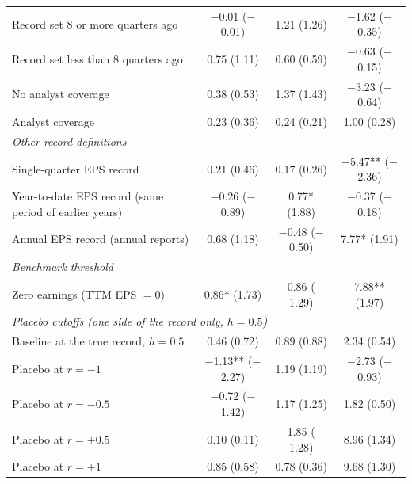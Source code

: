 \begin{tabular}{lccc}
\quad Record set 8 or more quarters ago & \ensuremath{-}0.01 (\ensuremath{-}0.01) & 1.21 (1.26) & \ensuremath{-}1.62 (\ensuremath{-}0.35)\\
\quad Record set less than 8 quarters ago & 0.75 (1.11) & 0.60 (0.59) & \ensuremath{-}0.63 (\ensuremath{-}0.15)\\
\quad No analyst coverage & 0.38 (0.53) & 1.37 (1.43) & \ensuremath{-}3.23 (\ensuremath{-}0.64)\\
\quad Analyst coverage & 0.23 (0.36) & 0.24 (0.21) & 1.00 (0.28)\\
\multicolumn{4}{l}{\textit{Other record definitions}}\\
\quad Single-quarter EPS record & 0.21 (0.46) & 0.17 (0.26) & \ensuremath{-}5.47** (\ensuremath{-}2.36)\\
\quad Year-to-date EPS record (same period of earlier years) & \ensuremath{-}0.26 (\ensuremath{-}0.89) & 0.77* (1.88) & \ensuremath{-}0.37 (\ensuremath{-}0.18)\\
\quad Annual EPS record (annual reports) & 0.68 (1.18) & \ensuremath{-}0.48 (\ensuremath{-}0.50) & 7.77* (1.91)\\
\multicolumn{4}{l}{\textit{Benchmark threshold}}\\
\quad Zero earnings (TTM EPS $=0$) & 0.86* (1.73) & \ensuremath{-}0.86 (\ensuremath{-}1.29) & 7.88** (1.97)\\
\multicolumn{4}{l}{\textit{Placebo cutoffs (one side of the record only, $h=0.5$)}}\\
\quad Baseline at the true record, $h=0.5$ & 0.46 (0.72) & 0.89 (0.88) & 2.34 (0.54)\\
\quad Placebo at $r=-1$ & \ensuremath{-}1.13** (\ensuremath{-}2.27) & 1.19 (1.19) & \ensuremath{-}2.73 (\ensuremath{-}0.93)\\
\quad Placebo at $r=-0.5$ & \ensuremath{-}0.72 (\ensuremath{-}1.42) & 1.17 (1.25) & 1.82 (0.50)\\
\quad Placebo at $r=+0.5$ & 0.10 (0.11) & \ensuremath{-}1.85 (\ensuremath{-}1.28) & 8.96 (1.34)\\
\quad Placebo at $r=+1$ & 0.85 (0.58) & 0.78 (0.36) & 9.68 (1.30)\\
\bottomrule
\end{tabular}
